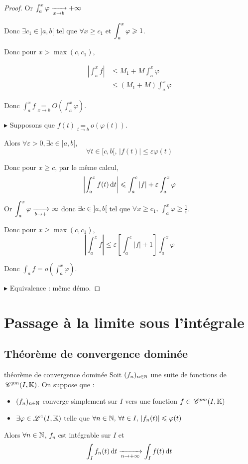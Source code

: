\begin{proof}
    Or $\int_{a }^{x } \varphi \xrightarrow[x \to b]{} + \infty$

    Donc $\exists c_1 \in ]a, b[$ tel que $\forall x \geqslant c_1$ et $\displaystyle \int_{a }^{x } \varphi \geqslant 1$. 

    Donc pour $x > \max (c, c_1)$, 

    \begin{align}
        \left| \int_{a }^{x } f \right| & \leqslant M_1 + M \int_{a }^{x } \varphi \\
        & \leqslant (M_1 + M) \int_{a }^{x } \varphi
    \end{align}

    Donc $\int_{a }^{x } f \underset{x \to b }{=} O\left( \int_{a }^{x } \varphi \right)$.

    $\blacktriangleright$ Supposons que $f(t) \underset{t \to b }{= } o(\varphi(t))$. 

    Alors $\forall \varepsilon > 0, \exists c \in ]a, b[$, 
    $$\forall t \in [c, b[, \, |f(t)| \leqslant \varepsilon \varphi(t)$$

    Donc pour $x \geqslant c$, par le même calcul, 
    $$\left| \int_{a }^{x } f(t) \,\mathrm{d}t \right| \leqslant \int_a^c | f| + \varepsilon \int_a^x \varphi$$

    Or $\displaystyle \int_a^x \varphi \xrightarrow[b \to +]{} \infty$ donc $\exists c \in ]a, b[$ tel que 
    $\forall x \geqslant c_1, \, \int_a^x \varphi \geqslant \frac 1 \varepsilon$.

    Donc pour $x \geqslant \max (c, c_1)$,
    $$\left| \int_a^x f \right| \leqslant \varepsilon \left[ \int_a^c |f| + 1 \right] \int_a^x \varphi$$

    Donc $\int_a f = o\left( \int_a^x \varphi \right)$.

    $\blacktriangleright$ Equivalence : même démo. 
\end{proof}


\section{Passage à la limite sous l'intégrale}
\subsection{Théorème de convergence dominée }

\begin{theoreme}{théorème de convergence dominée}{}
    Soit $(f_n)_{n \in \mathbb{N}}$ une suite de fonctions de $\,\mathscr C^{pm}(I, \mathbb{K})$. On suppose que :
    \begin{itemize}
        \item $(f_n)_{n \in \mathbb{N}}$ converge simplement sur $I$ vers une fonction $f \in \,\mathscr C^{pm}(I, \mathbb{K})$
        \item $\exists \varphi \in \mathscr L^1(I, \mathbb{K})$ telle que 
        $\forall n \in \mathbb{N}, \, \forall t \in I, \, |f_n(t)| \leqslant \varphi(t)$
    \end{itemize}
    Alors 
    $\forall n \in \mathbb{N}$, $f_n$ est intégrable sur $I$ et 
    $$\int_I f_n(t) \,\mathrm{d}t \xrightarrow[n \to + \infty]{} \int_I f(t) \,\mathrm{d}t$$
\end{theoreme}

